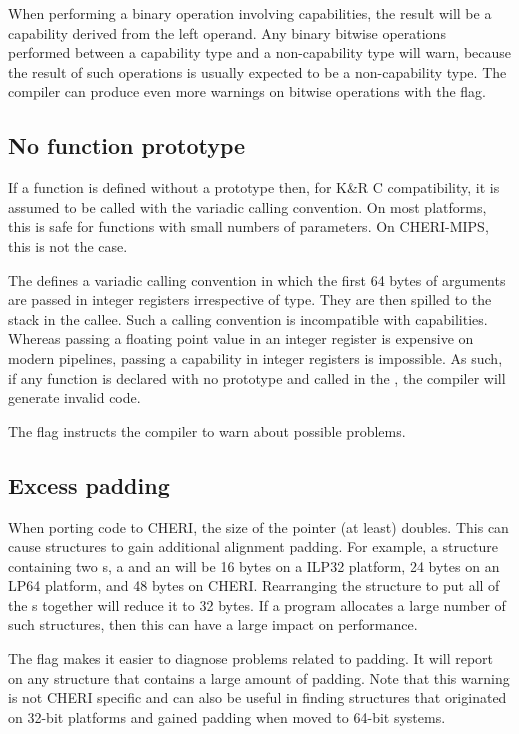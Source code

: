 When performing a binary operation involving capabilities, the result will be a capability derived from the left operand.
Any binary bitwise operations performed between a capability type and a non-capability type will warn, because the result of such operations is usually expected to be a non-capability type.
The compiler can produce even more warnings on bitwise operations with the  flag.

\subsection{No function prototype}

If a function is defined without a prototype then, for K\&R C compatibility, it is assumed to be called with the variadic calling convention.
On most platforms, this is safe for functions with small numbers of parameters.
On CHERI-MIPS, this is not the case.

The \mipsABI{} defines a variadic calling convention in which the first 64 bytes of arguments are passed in integer registers irrespective of type.
They are then spilled to the stack in the callee.
Such a calling convention is incompatible with capabilities.
Whereas passing a floating point value in an integer register is expensive on modern pipelines, passing a capability in integer registers is impossible.
As such, if any function is declared with no prototype and called in the \sandboxABI{}, the compiler will generate invalid code.

The  flag instructs the compiler to warn about possible problems.

\subsection{Excess padding}

When porting code to CHERI, the size of the pointer (at least) doubles.
This can cause structures to gain additional alignment padding.
For example, a structure containing two s, a  and an  will be 16 bytes on a ILP32 platform, 24 bytes on an LP64 platform, and 48 bytes on CHERI.
Rearranging the structure to put all of the s together will reduce it to 32 bytes.
If a program allocates a large number of such structures, then this can have a large impact on performance.

The  flag makes it easier to diagnose problems related to padding.
It will report on any structure that contains a large amount of padding.
Note that this warning is not CHERI specific and can also be useful in finding structures that originated on 32-bit platforms and gained padding when moved to 64-bit systems.


